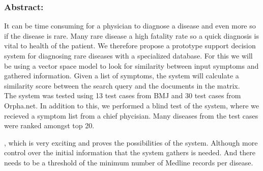 \subsubsection*{Abstract:}

It can be time consuming for a physician to diagnose a disease and
even more so if the disease is rare. Many rare disease a high fatality
rate so a quick diagnosis is vital to health of the patient. We
therefore propose a prototype support decision system for diagnosing
rare diseases with a specialized database. For this we will be using a
vector space model to look for similarity between input symptoms and
gathered information. Given a list of symptoms, the system will
calculate a similarity score between the search query and the
documents in the matrix. \\


The system was tested using 13 test cases from
BMJ \cite{HangwiTang11102006} and 30 test cases from Orpha.net. In
addition to this, we performed a blind test of the system, where we
recieved a symptom list from a chief phycisian. Many diseases from the
test cases were ranked amongst top 20.

, which is very exciting and proves the
possibilities of the system. Although more control over the initial
information that the system gathers is needed. And there needs to be a
threshold of the minimum number of Medline records per disease.\\
